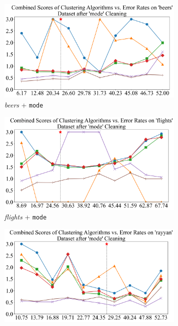 \documentclass[10pt]{article} %
\numberwithin{equation}{section}
\begin{document}
\begin{figure}[htbp]
  \centering
  \footnotesize %
  \setlength{\abovecaptionskip}{2pt} %
  \setlength{\belowcaptionskip}{2pt} %

  \begin{subfigure}{0.24\linewidth} %
    \centering
    \includegraphics[width=\linewidth]{mode_beers_combined_scores.png}
    \caption{\textit{beers} + \texttt{mode}}
    \label{fig:mode_beers}
  \end{subfigure}
  \hfill
  \begin{subfigure}{0.24\linewidth}
    \centering
    \includegraphics[width=\linewidth]{mode_flights_combined_scores.png}
    \caption{\textit{flights} + \texttt{mode}}
    \label{fig:mode_flights}
  \end{subfigure}
  \hfill
  \begin{subfigure}{0.24\linewidth}
    \centering
    \includegraphics[width=\linewidth]{mode_rayyan_combined_scores.png}

\end{subfigure}
\end{figure}
\end{document}
